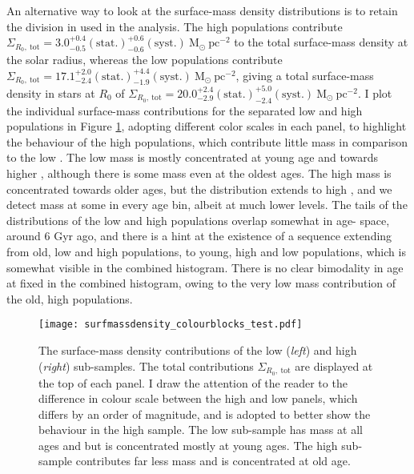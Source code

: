 An alternative way to look at the surface-mass density distributions is to retain the division in \afe{} used in the analysis. The high \afe{} populations contribute $\Sigma_{R_0,\ \mathrm{tot}} = 3.0_{-0.5}^{+0.4}\mathrm{(stat.)}_{-0.6}^{+0.6}\mathrm{(syst.)}\ \mathrm{M_{\odot}\ pc^{-2}}$ to the total surface-mass density at the solar radius, whereas the low \afe{} populations contribute $\Sigma_{R_0,\ \mathrm{tot}} = 17.1_{-2.4}^{+2.0}\mathrm{(stat.)}_{-1.9}^{+4.4}\mathrm{(syst.)}\ \mathrm{M_{\odot}\ pc^{-2}}$, giving a total surface-mass density in stars at $R_0$ of $\Sigma_{R_0,\ \mathrm{tot}} = 20.0_{-2.9}^{+2.4}\mathrm{(stat.)}_{-2.4}^{+5.0}\mathrm{(syst.)}\ \mathrm{M_{\odot}\ pc^{-2}}$. I plot the individual surface-mass contributions for the separated low and high \afe{} populations in Figure \ref{fig:massafe}, adopting different color scales in each panel, to highlight the behaviour of the high \afe{} populations, which contribute little mass in comparison to the low \afe{}. The low \afe{} mass is mostly concentrated at young age and towards higher \feh{}, although there is some mass even at the oldest ages. The high \afe{} mass is concentrated towards older ages, but the distribution extends to high \feh{}, and we detect mass at some \feh{} in every age bin, albeit at much lower levels. The tails of the distributions of the low and high \afe{} populations overlap somewhat in age-\feh{} space, around 6 Gyr ago, and there is a hint at the existence of a sequence extending from old, low \feh{} and high \afe{} populations, to young, high \feh{} and low \afe{} populations, which is somewhat visible in the combined histogram. There is no clear bimodality in age at fixed \feh{} in the combined histogram, owing to the very low mass contribution of the old, high \afe{} populations. 

\begin{figure}
\texttt{[image: surfmassdensity\_colourblocks\_test.pdf]}
 	\centering
     \caption[The separated surface mass density contributions of mono-age, mono-\feh{} populations in the low and high \afe{} populations]{The surface-mass density contributions of the low (\emph{left}) and high (\emph{right}) \afe{} sub-samples. The total contributions $\Sigma_{R_0,\ \mathrm{tot}}$ are displayed at the top of each panel. I draw the attention of the reader to the difference in colour scale between the high and low \afe{} panels, which differs by an order of magnitude, and is adopted to better show the behaviour in the high \afe{} sample. The low \afe{} sub-sample has mass at all ages and \feh{} but is concentrated mostly at young ages. The high \afe{} sub-sample contributes far less mass and is concentrated at old age.}
     \label{fig:massafe}
\end{figure}


